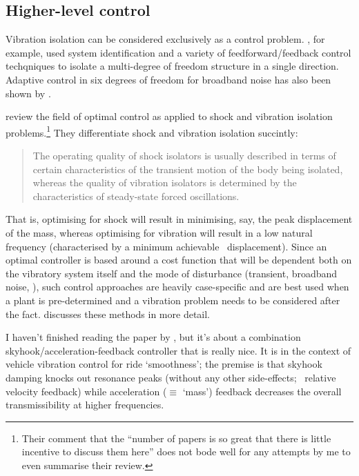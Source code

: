 \subsection{Higher-level control}

Vibration isolation can be considered exclusively as a control
problem. \textcite{guo2005}, for example, used system identification
and a variety of feedforward/feedback control techqniques to isolate a
multi-degree of freedom structure in a single direction. Adaptive
control in six degrees of freedom for broadband noise has also been
shown by \textcite{duindam2005}.

\textcite{balandin1998} review the field of optimal control as applied
to shock and vibration isolation problems.\footnote{Their comment that the
  \enquote{number of papers is so great that there is little incentive to
  discuss them here} does not bode well for any attempts by me to
  even summarise their review.} 
  They differentiate shock and vibration isolation succintly:
\begin{quote}
  The operating quality of shock isolators is usually described in
  terms of certain characteristics of the transient motion of the body
  being isolated, whereas the quality of vibration isolators is
  determined by the characteristics of steady-state forced
  oscillations.
\end{quote}
That is, optimising for shock will result in minimising, say, the peak
displacement of the mass, whereas optimising for vibration will result
in a low natural frequency (characterised by a minimum achievable
\RMS\ displacement). Since an optimal controller is based around a
cost function that will be dependent both on the vibratory system
itself and the mode of disturbance (transient, broadband noise, \etc),
such control approaches are heavily case-specific and are best used
when a plant is pre-determined and a vibration problem needs to be
considered after the fact. \textcite{bolotnik2001} discusses these
methods in more detail.

I haven't finished reading the paper by \textcite{savaresi2007}, but
it's about a combination skyhook/acceleration-feedback controller that
is really nice. It is in the context of vehicle vibration control for
ride `smoothness'; the premise is that skyhook damping knocks out
resonance peaks (without any other side-effects; \cf\ relative
velocity feedback) while acceleration ($\equiv$ `mass') feedback
decreases the overall transmissibility at higher frequencies.




